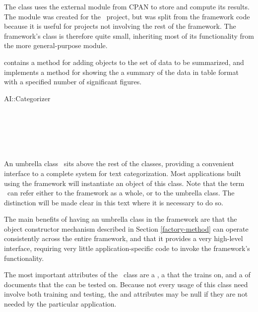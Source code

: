 \begin{description}
The  class uses the external module
 from CPAN to store and compute its
results.  The  module was created for
the \aicat\ project, but was split from the framework code because it
is useful for projects not involving the rest of the framework.  The
framework's  class is therefore quite small,
inheriting most of its functionality from the more general-purpose
module.

 contains a  method for
adding  objects to the set of data to be summarized,
and implements a  method for showing the a
summary of the data in table format with a specified number of
significant figures.

\item
\begin{concreteclass}{AI::Categorizer}
 \attributes
   \\
   \\
 \methods
   \\
   \\
   \\
   \\
\end{concreteclass}

An umbrella class \aicat\ sits above the rest of the classes,
providing a convenient interface to a complete system for text
categorization.  Most applications built using the framework will
instantiate an object of this class.  Note that the term \aicat\ can
refer either to the framework as a whole, or to the umbrella class.
The distinction will be made clear in this text where it is necessary
to do so.

The main benefits of having an umbrella class in the framework are
that the object constructor mechanism described in Section
\ref{factory-method} can operate consistently across the entire
framework, and that it provides a very high-level interface, requiring
very little application-specific code to invoke the framework's
functionality.

The most important attributes of the \aicat\ class are a
, a  that the 
trains on, and a  of documents that the
 can be tested on.  Because not every usage of this
class need involve both training and testing, the 
and  attributes may be null if they are not needed
by the particular application.


\end{description}

